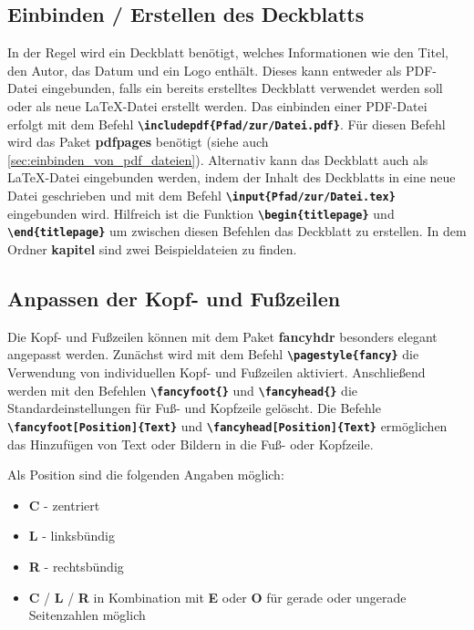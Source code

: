 \subsection{Einbinden / Erstellen des Deckblatts}
In der Regel wird ein Deckblatt benötigt, welches Informationen wie den Titel, den Autor, das Datum und ein Logo enthält. Dieses kann entweder als PDF-Datei eingebunden, falls ein bereits erstelltes Deckblatt verwendet werden soll oder als neue \LaTeX{}-Datei erstellt werden.
Das einbinden einer PDF-Datei erfolgt mit dem Befehl \textbf{\texttt{\textbackslash includepdf\{Pfad/zur/Datei.pdf\}}}. Für diesen Befehl wird das Paket \textbf{pdfpages} benötigt (siehe auch \ref{sec:einbinden_von_pdf_dateien}).
Alternativ kann das Deckblatt auch als \LaTeX{}-Datei eingebunden werden, indem der Inhalt des Deckblatts in eine neue Datei geschrieben und mit dem Befehl \textbf{\texttt{\textbackslash input\{Pfad/zur/Datei.tex\}}} eingebunden wird. Hilfreich ist die Funktion \textbf{\texttt{\textbackslash begin\{titlepage\}}} und \textbf{\texttt{\textbackslash end\{titlepage\}}} um zwischen diesen Befehlen das Deckblatt zu erstellen. In dem Ordner \textbf{kapitel} sind zwei Beispieldateien zu finden.

\subsection{Anpassen der Kopf- und Fußzeilen}
Die Kopf- und Fußzeilen können mit dem Paket \textbf{fancyhdr} besonders elegant angepasst werden. Zunächst wird mit dem Befehl \textbf{\texttt{\textbackslash pagestyle\{fancy\}}} die Verwendung von individuellen Kopf- und Fußzeilen aktiviert. Anschließend werden mit den Befehlen \textbf{\texttt{\textbackslash fancyfoot\{\}}} und \textbf{\texttt{\textbackslash fancyhead\{\}}} die Standardeinstellungen für Fuß- und Kopfzeile gelöscht. Die Befehle \textbf{\texttt{\textbackslash fancyfoot[Position]\{Text\}}} und \textbf{\texttt{\textbackslash fancyhead[Position]\{Text\}}} ermöglichen das Hinzufügen von Text oder Bildern in die Fuß- oder Kopfzeile.

Als Position sind die folgenden Angaben möglich:
\begin{itemize}
    \item \textbf{C} - zentriert
    \item \textbf{L} - linksbündig
    \item \textbf{R} - rechtsbündig
    \item \textbf{C} / \textbf{L} / \textbf{R} in Kombination mit \textbf{E} oder \textbf{O} für gerade oder ungerade Seitenzahlen möglich
\end{itemize}

